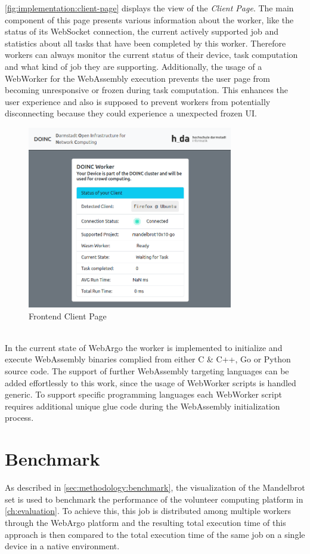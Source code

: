 \autoref{fig:implementation:client-page} displays the view of the \emph{Client Page}. The main component of this page presents various information about the worker, like the status of its WebSocket connection, the current actively supported job and statistics about all tasks that have been completed by this worker. Therefore workers can always monitor the current status of their device, task computation and what kind of job they are supporting. Additionally, the usage of a WebWorker for the WebAssembly execution prevents the user page from becoming unresponsive or frozen during task computation. This enhances the user experience and also is supposed to prevent workers from potentially disconnecting because they could experience a unexpected frozen \ac{UI}.
\clearpage
\begin{figure}[htbp]
    \centering
    \includegraphics[width=0.8\textwidth]{gfx/figures/client-page.png}
    \caption{Frontend Client Page}
    \label{fig:implementation:client-page}
\end{figure}
~\\
In the current state of WebArgo the worker is implemented to initialize and execute WebAssembly binaries complied from either C \& C++, Go or Python source code. The support of further WebAssembly targeting languages can be added effortlessly to this work, since the usage of WebWorker scripts is handled generic. To support specific programming languages each WebWorker script requires additional unique glue code during the WebAssembly initialization process.

\section{Benchmark}
\label{sec:implementation:benchmark}
As described in \autoref{sec:methodology:benchmark}, the visualization of the Mandelbrot set is used to benchmark the performance of the volunteer computing platform in \autoref{ch:evaluation}. To achieve this, this job is distributed among multiple workers through the WebArgo platform and the resulting total execution time of this approach is then compared to the total execution time of the same job on a single device in a native environment.


